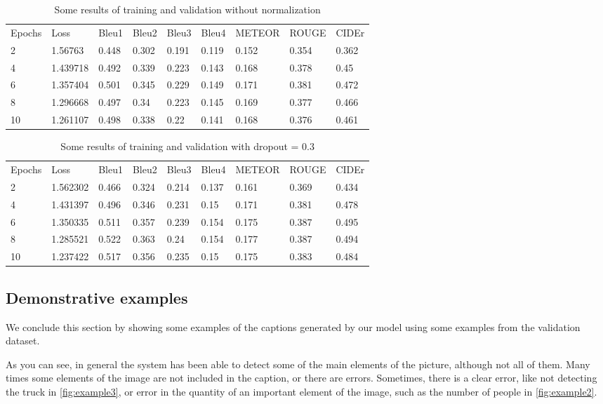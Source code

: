 \begin{table}[hbt]
\caption{Some results of training and validation without normalization}
\label{tab:without-dropout}
\begin{tabular}{lllllllll}
Epochs & Loss & Bleu1 & Bleu2 & Bleu3 & Bleu4 & METEOR & ROUGE & CIDEr \\
2 & 1.56763 & 0.448 & 0.302 & 0.191 & 0.119 & 0.152 & 0.354 & 0.362 \\
4 & 1.439718 & 0.492 & 0.339 & 0.223 & 0.143 & 0.168 & 0.378 & 0.45 \\
6 & 1.357404 & 0.501 & 0.345 & 0.229 & 0.149 & 0.171 & 0.381 & 0.472 \\
8 & 1.296668 & 0.497 & 0.34 & 0.223 & 0.145 & 0.169 & 0.377 & 0.466 \\
10 & 1.261107 & 0.498 & 0.338 & 0.22 & 0.141 & 0.168 & 0.376 & 0.461
\end{tabular}
\end{table}

\begin{table}[hbt]
\caption{Some results of training and validation with dropout = 0.3}
\label{tab:with-dropout}
\begin{tabular}{lllllllll}
Epochs & Loss & Bleu1 & Bleu2 & Bleu3 & Bleu4 & METEOR & ROUGE & CIDEr \\
2 & 1.562302 & 0.466 & 0.324 & 0.214 & 0.137 & 0.161 & 0.369 & 0.434 \\
4 & 1.431397 & 0.496 & 0.346 & 0.231 & 0.15 & 0.171 & 0.381 & 0.478 \\
6 & 1.350335 & 0.511 & 0.357 & 0.239 & 0.154 & 0.175 & 0.387 & 0.495 \\
8 & 1.285521 & 0.522 & 0.363 & 0.24 & 0.154 & 0.177 & 0.387 & 0.494 \\
10 & 1.237422 & 0.517 & 0.356 & 0.235 & 0.15 & 0.175 & 0.383 & 0.484 \\
\end{tabular}
\end{table}

\subsection{Demonstrative examples}

We conclude this section by showing some examples of the captions generated by our model using some examples from the validation dataset. 

As you can see, in general the system has been able to detect some of the main elements of the picture, although not all of them. Many times some elements of the image are not included in the caption, or there are errors. Sometimes, there is a clear error, like not detecting the truck in \cref{fig:example3}, or error in the quantity of an important element of the image, such as the number of people in \cref{fig:example2}.

